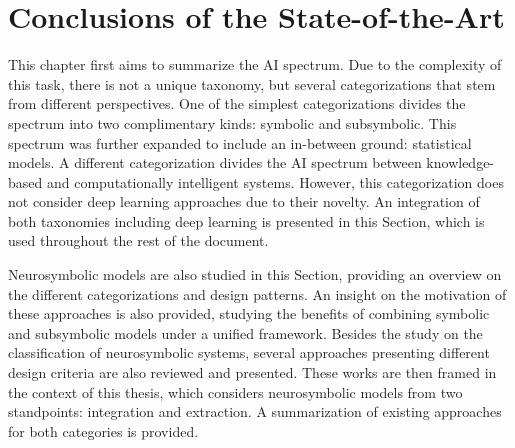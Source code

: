 \section{Conclusions of the State-of-the-Art}
This chapter first aims to summarize the AI spectrum. Due to the complexity of this task, there is not a unique taxonomy, but several categorizations that stem from different perspectives. One of the simplest categorizations divides the spectrum into two complimentary kinds: symbolic and subsymbolic. This spectrum was further expanded to include an in-between ground: statistical models. A different categorization divides the AI spectrum between knowledge-based and computationally intelligent systems. However, this categorization does not consider deep learning approaches due to their novelty. An integration of both taxonomies including deep learning is presented in this Section, which is used throughout the rest of the document.

Neurosymbolic models are also studied in this Section, providing an overview on the different categorizations and design patterns. An insight on the motivation of these approaches is also provided, studying the benefits of combining symbolic and subsymbolic models under a unified framework. Besides the study on the classification of neurosymbolic systems, several approaches presenting different design criteria are also reviewed and presented. These works are then framed in the context of this thesis, which considers neurosymbolic models from two standpoints: integration and extraction. A summarization of existing approaches for both categories is provided. 
